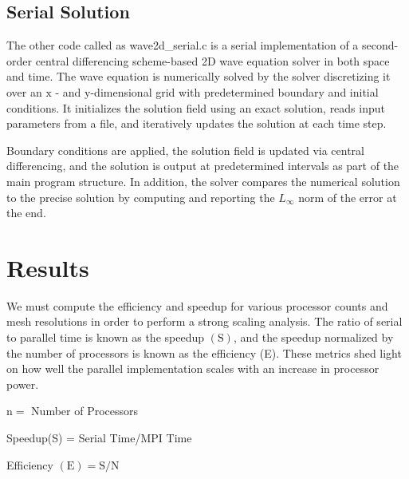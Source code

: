 \documentclass[10pt]{article}
\begin{document}
\subsection{Serial Solution}
The other code called as wave2d\_serial.c is a serial implementation of a second-order central differencing scheme-based 2D wave equation solver in both space and time. The wave equation is numerically solved by the solver discretizing it over an $\mathrm{x}$ - and $\mathrm{y}$-dimensional grid with predetermined boundary and initial conditions. It initializes the solution field using an exact solution, reads input parameters from a file, and iteratively updates the solution at each time step.

Boundary conditions are applied, the solution field is updated via central differencing, and the solution is output at predetermined intervals as part of the main program structure. In addition, the solver compares the numerical solution to the precise solution by computing and reporting the $L_{\infty}$ norm of the error at the end.

\section{Results}
We must compute the efficiency and speedup for various processor counts and mesh resolutions in order to perform a strong scaling analysis. The ratio of serial to parallel time is known as the speedup $(\mathrm{S})$, and the speedup normalized by the number of processors is known as the efficiency (E). These metrics shed light on how well the parallel implementation scales with an increase in processor power.

$\mathrm{n}=$ Number of Processors

Speedup(S) = Serial Time/MPI Time

Efficiency $(\mathrm{E})=\mathrm{S} / \mathrm{N}$
\end{document}
